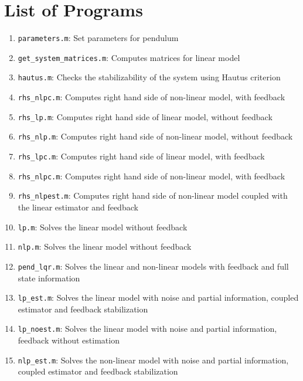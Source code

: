 \documentclass[12pt]{article}
\begin{document}
\section{List of Programs}

\begin{enumerate}

\item {\tt parameters.m}: Set parameters for pendulum

\item {\tt get\_system\_matrices.m}: Computes matrices for linear model

\item {\tt hautus.m}: Checks the stabilizability of the system using Hautus criterion
\item {\tt rhs\_nlpc.m}: Computes right hand side of non-linear model, with feedback
\item {\tt rhs\_lp.m}: Computes right hand side of linear model, without feedback

\item {\tt rhs\_nlp.m}: Computes right hand side of non-linear model, without feedback

\item {\tt rhs\_lpc.m}: Computes right hand side of linear model, with feedback

\item {\tt rhs\_nlpc.m}: Computes right hand side of non-linear model, with feedback

\item {\tt rhs\_nlpest.m}: Computes right hand side of non-linear model coupled with the linear estimator and feedback

\item {\tt lp.m}: Solves the linear model without feedback

\item {\tt nlp.m}: Solves the linear model without feedback

\item {\tt pend\_lqr.m}: Solves the linear and non-linear models with feedback and full state information

\item {\tt lp\_est.m}: Solves the linear model with noise and partial information, coupled estimator and feedback stabilization

\item {\tt lp\_noest.m}: Solves the linear model with noise and partial information, feedback without estimation

\item {\tt nlp\_est.m}: Solves the non-linear model with noise and partial information, coupled estimator and feedback stabilization

\end{enumerate}
\end{document}
